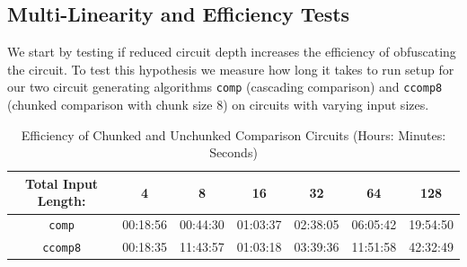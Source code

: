 \documentclass[12pt,twoside]{reedthesis}
\begin{document}
 \subsection{Multi-Linearity and Efficiency Tests}
 \par We start by testing if reduced circuit depth increases the efficiency of obfuscating the circuit. To test this hypothesis we measure how long it takes to run setup for our two circuit generating algorithms \texttt{comp} (cascading comparison) and \texttt{ccomp8} (chunked comparison with chunk size 8) on circuits with varying input sizes. 
 \begin{table}[htbp] %
\caption[]{Efficiency of Chunked and Unchunked Comparison Circuits (Hours: Minutes: Seconds)} 
\begin{center} 
\begin{tabular}{c c c c c c c} 
\toprule %
  Total Input Length: &4 &8 &16 &32 &64 &128 \\ %
  \midrule %
	\texttt{comp} &00:18:56 &00:44:30 &01:03:37 & 02:38:05 & 06:05:42 &19:54:50\\
	\texttt{ccomp8} &00:18:35 &11:43:57 &01:03:18 &03:39:36 &11:51:58 & 42:32:49 \\
		\bottomrule %
\end{tabular}
\end{center}
\label{inheritance} %
\end{table}
\end{document}
